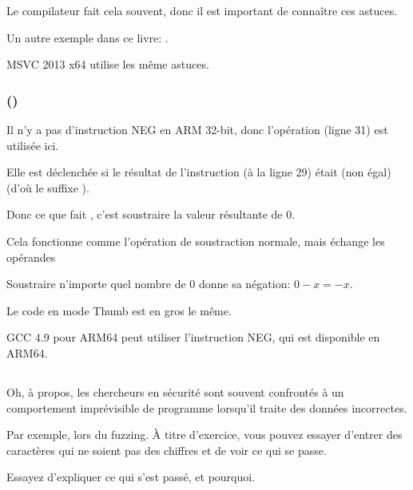 Le compilateur fait cela souvent, donc il est important de connaître ces astuces.

Un autre exemple dans ce livre:
.

MSVC 2013 x64 \Optimizing utilise les même astuces.

\subsubsection{\OptimizingKeilVI (\ARMMode)}



Il n'y a pas d'instruction NEG en ARM 32-bit, donc l'opération 
(ligne 31) est utilisée ici.

Elle est déclenchée si le résultat de l'instruction  (à la ligne 29) était
 (non égal) (d'où le suffixe ).

Donc ce que fait , c'est soustraire la valeur résultante de 0.

Cela fonctionne comme l'opération de soustraction normale, mais échange les opérandes

Soustraire n'importe quel nombre de 0 donne sa négation: $0-x=-x$.

Le code en mode Thumb est en gros le même.

GCC 4.9 pour ARM64 peut utiliser l'instruction NEG, qui est disponible en ARM64.

\subsection{\Exercise{}}

Oh, à propos, les chercheurs en sécurité sont souvent confrontés à un comportement
imprévisible de programme lorsqu'il traite des données incorrectes.

Par exemple, lors du fuzzing.
À titre d'exercice, vous pouvez essayer d'entrer des caractères qui ne soient pas
des chiffres et de voir ce qui se passe.

Essayez d'expliquer ce qui s'est passé, et pourquoi.

